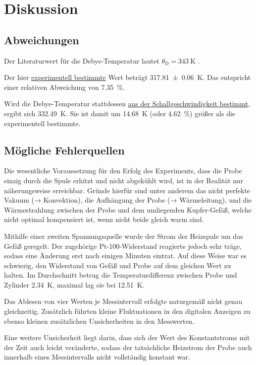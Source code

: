 \section{Diskussion}
\label{sec:diskussion}

\subsection{Abweichungen}

    Der Literaturwert für die Debye-Temperatur lautet $\theta_\text{D} = \SI{343}{\kelvin}$ \cite[Abbildung 6.9]{grossmarx}.

    Der hier \hyperref[sec:auswertung:debye_exp]{experimentell bestimmte} Wert beträgt \SI{317.81(6)}{\kelvin}.
    Das entspricht einer relativen Abweichung von \SI{7.35}{\percent}.

    Wird die Debye-Temperatur stattdessen \hyperref[sec:auswertung:debye_vs]{aus der Schallgeschwindigkeit bestimmt},
    ergibt sich \SI{332.49}{\kelvin}.
    Sie ist damit um \SI{14.68}{\kelvin} (oder \SI{4.62}{\percent}) größer als die experimentell bestimmte.


\subsection{Mögliche Fehlerquellen}


    Die wesentliche Voraussetzung für den Erfolg des Experiments,
    dass die Probe einzig durch die Spule erhitzt und nicht abgekühlt wird,
    ist in der Realität nur näherungsweise erreichbar.
    Gründe hierfür sind unter anderem
    das nicht perfekte Vakuum (→ Konvektion),
    die Aufhängung der Probe (→ Wärmeleitung), %
    und die Wärmestrahlung zwischen der Probe und dem umliegenden Kupfer-Gefäß,
    welche nicht optimal kompensiert ist,
    wenn nicht beide gleich warm sind.

    Mithilfe einer zweiten Spannungsquelle wurde der Strom der Heizspule um das Gefäß geregelt.
    Der zugehörige Pt-100-Widerstand reagierte jedoch sehr träge,
    sodass eine Änderung erst nach einigen Minuten eintrat.
    Auf diese Weise war es schwierig,
    den Widerstand von Gefäß und Probe auf dem gleichen Wert zu halten.
    Im Durchschnitt betrug die Temperaturdifferenz zwischen Probe und Zylinder \SI{2.34}{\kelvin},
    maximal lag sie bei \SI{12.51}{\kelvin}.

    Das Ablesen von vier Werten je Messintervall erfolgte naturgemäß nicht genau gleichzeitig.
    Zusätzlich führten kleine Fluktuationen in den digitalen Anzeigen
    zu ebenso kleinen zusätzlichen Unsicherheiten in den Messwerten.

    Eine weitere Unsicherheit liegt darin,
    dass sich der Wert des Konstantstroms mit der Zeit auch leicht veränderte,
    sodass der tatsächliche Heizstrom der Probe
    auch innerhalb eines Messintervalls nicht vollständig konstant war.
